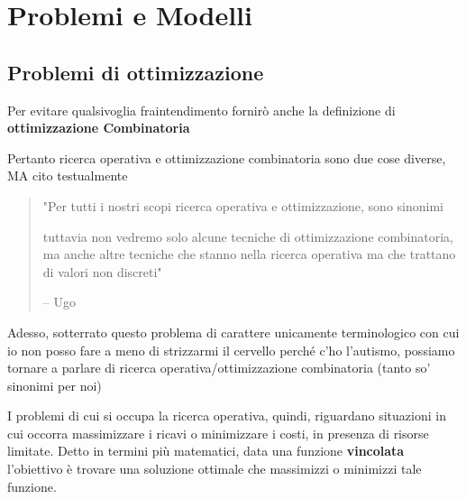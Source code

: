 % 
\chapter{Problemi e Modelli}

\section{Problemi di ottimizzazione}


Per evitare qualsivoglia fraintendimento fornirò anche la definizione di \textbf{ottimizzazione Combinatoria}

Pertanto ricerca operativa e ottimizzazione combinatoria sono due cose diverse, MA cito testualmente
\begin{quote}
  "Per tutti i nostri scopi ricerca operativa e ottimizzazione, sono sinonimi

  tuttavia non vedremo solo alcune tecniche di ottimizzazione combinatoria, ma anche altre tecniche che stanno nella ricerca operativa ma che trattano di valori non discreti"

  \hfill -- Ugo
\end{quote}

Adesso, sotterrato questo problema di carattere unicamente terminologico con cui io non posso fare a meno di strizzarmi il cervello perché c'ho l'autismo, possiamo tornare a parlare di ricerca operativa/ottimizzazione combinatoria (tanto so' sinonimi per noi)

I problemi di cui si occupa la ricerca operativa, quindi, riguardano situazioni in cui occorra massimizzare i ricavi o minimizzare i costi, in presenza di risorse limitate. Detto in termini più matematici, data una funzione \textbf{vincolata} l'obiettivo è trovare una soluzione ottimale che massimizzi o minimizzi tale funzione.

